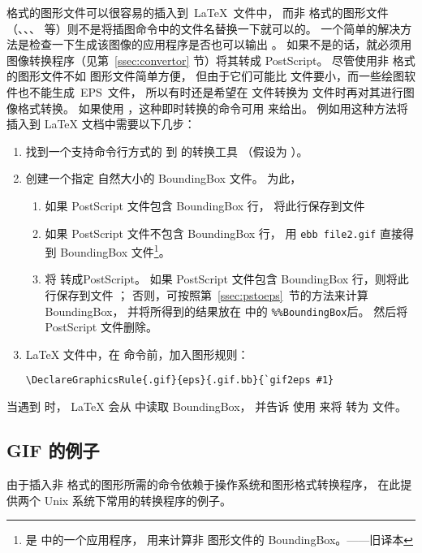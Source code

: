  格式的图形文件可以很容易的插入到~\LaTeX{}~文件中，
而非  格式的图形文件（、、、 等）则不是将插图命令中的文件名替换一下就可以的。
一个简单的解决方法是检查一下生成该图像的应用程序是否也可以输出 。
如果不是的话，就必须用图像转换程序（见第~\ref{ssec:convertor} 节）将其转成 PostScript。
尽管使用非  格式的图形文件不如  图形文件简单方便，
但由于它们可能比  文件要小，而一些绘图软件也不能生成~EPS~文件，
所以有时还是希望在  文件转换为  文件时再对其进行图像格式转换。
如果使用 ，这种即时转换的命令可用 来给出。
例如用这种方法将  插入到 \LaTeX{} 文档中需要以下几步：
\begin{enumerate}
	\item 找到一个支持命令行方式的  到  的转换工具
	（假设为 ）。
	\item 创建一个指定  自然大小的 BoundingBox 文件。
	为此，
	\begin{enumerate}
		\item 如果 PostScript 文件包含 BoundingBox 行，
		将此行保存到文件 
		\item 如果 PostScript 文件不包含 BoundingBox 行，
		用 \verb|ebb file2.gif| 直接得到 BoundingBox 文件\footnote{
			 是  中的一个应用程序，
			用来计算非 图形文件的 BoundingBox。——旧译本}。
		\item 将  转成PostScript。
		如果 PostScript 文件包含 BoundingBox 行，则将此行保存到文件 ；
		否则，可按照第~\ref{ssec:pstoeps}~节的方法来计算 BoundingBox，
		并将所得到的结果放在  中的 \verb|%%BoundingBox|后。
		然后将 PostScript 文件删除。
	\end{enumerate}
	\item \LaTeX{} 文件中，在  命令前，加入图形规则：
\begin{lstlisting}
\DeclareGraphicsRule{.gif}{eps}{.gif.bb}{`gif2eps #1}
\end{lstlisting}
\end{enumerate}
当遇到  时，
\LaTeX{} 会从  中读取 BoundingBox，
并告诉  使用  来将  转为  文件。


\subsection{GIF 的例子}\label{ssec:gifexample}
由于插入非  格式的图形所需的命令依赖于操作系统和图形格式转换程序，
在此提供两个 Unix 系统下常用的转换程序的例子。

